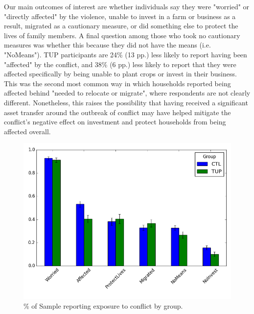 \documentclass[12pt,article]{article}
\begin{document}
Our main outcomes of interest are whether individuals say they were "worried" or
"directly affected" by the violence, unable to invest in a farm or business as a
result, migrated as a cautionary measure, or did something else to protect the lives
of family members. A final question among those who took no cautionary measures was
whether this because they did not have the means (i.e. "NoMeans"). TUP participants
are 24\% (13 pp.) less likely to report having been "affected" by the conflict, and
38\% (6 pp.) less likely to report that they were affected specifically by being
unable to plant crops or invest in their business. This was the second most common
way in which households reported being affected behind "needed to relocate or
migrate", where respondents are not clearly different. Nonetheless, this raises the
possibility that having received a significant asset transfer around the outbreak of
conflict may have helped mitigate the conflict's negative effect on investment and
protect households from being affected overall.

\begin{figure}[htb]
\centering
\includegraphics[width=.9\linewidth]{../figures/conflict_exposure.png}
\caption{\label{fig:orgparagraph3}
\% of Sample reporting exposure to conflict by group.}
\end{figure} 
\end{document}

